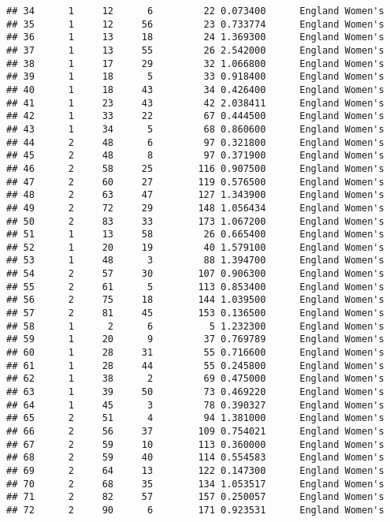 \documentclass[]{article}
\begin{document}
\begin{verbatim}
## 34      1     12      6         22 0.073400      England Women's
## 35      1     12     56         23 0.733774      England Women's
## 36      1     13     18         24 1.369300      England Women's
## 37      1     13     55         26 2.542000      England Women's
## 38      1     17     29         32 1.066800      England Women's
## 39      1     18      5         33 0.918400      England Women's
## 40      1     18     43         34 0.426400      England Women's
## 41      1     23     43         42 2.038411      England Women's
## 42      1     33     22         67 0.444500      England Women's
## 43      1     34      5         68 0.860600      England Women's
## 44      2     48      6         97 0.321800      England Women's
## 45      2     48      8         97 0.371900      England Women's
## 46      2     58     25        116 0.907500      England Women's
## 47      2     60     27        119 0.576500      England Women's
## 48      2     63     47        127 1.343900      England Women's
## 49      2     72     29        148 1.056434      England Women's
## 50      2     83     33        173 1.067200      England Women's
## 51      1     13     58         26 0.665400      England Women's
## 52      1     20     19         40 1.579100      England Women's
## 53      1     48      3         88 1.394700      England Women's
## 54      2     57     30        107 0.906300      England Women's
## 55      2     61      5        113 0.853400      England Women's
## 56      2     75     18        144 1.039500      England Women's
## 57      2     81     45        153 0.136500      England Women's
## 58      1      2      6          5 1.232300      England Women's
## 59      1     20      9         37 0.769789      England Women's
## 60      1     28     31         55 0.716600      England Women's
## 61      1     28     44         55 0.245800      England Women's
## 62      1     38      2         69 0.475000      England Women's
## 63      1     39     50         73 0.469220      England Women's
## 64      1     45      3         78 0.390327      England Women's
## 65      2     51      4         94 1.381000      England Women's
## 66      2     56     37        109 0.754021      England Women's
## 67      2     59     10        113 0.360000      England Women's
## 68      2     59     40        114 0.554583      England Women's
## 69      2     64     13        122 0.147300      England Women's
## 70      2     68     35        134 1.053517      England Women's
## 71      2     82     57        157 0.250057      England Women's
## 72      2     90      6        171 0.923531      England Women's

\end{verbatim}
\end{document}

